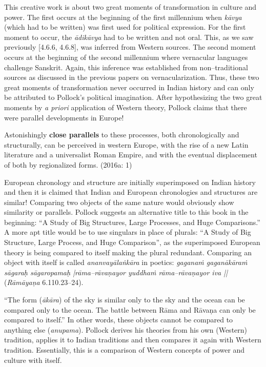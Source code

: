 This creative work is about two great moments of transformation in culture and power. The first occurs at the beginning of the first millennium when \textit{kāvya }(which had to be written) was first used for political expression. For the first moment to occur, the\textit{ ādikāvya }had to be written and not oral. This, as we saw previously [4.6.6, 4.6.8], was inferred from Western sources. The second moment occurs at the beginning of the second millennium where vernacular languages challenge Sanskrit. Again, this inference was established from non–traditional sources as discussed in the previous papers on vernacularization. Thus, these two great moments of transformation never occurred in Indian history and can only be attributed to Pollock’s political imagination. After hypothesizing the two great moments by \textit{a priori} application of Western theory, Pollock claims that there were parallel developments in Europe!

\begin{myquote}
Astonishingly \textbf{close parallels} to these processes, both chronologically and structurally, can be perceived in western Europe, with the rise of a new Latin literature and a universalist Roman Empire, and with the eventual displacement of both by regionalized forms. (2016a: 1)
\end{myquote}

European chronology and structure are initially superimposed on Indian history and then it is claimed that Indian and European chronologies and structures are similar! Comparing two objects of the same nature would obviously show similarity or parallels. Pollock suggests an alternative title to this book in the beginning: “A Study of Big Structures, Large Processes, and Huge Comparisons.” A more apt title would be to use singulars in place of plurals: “A Study of Big Structure, Large Process, and Huge Comparison”, as the superimposed European theory is being compared to itself making the plural redundant. Comparing an object with itself is called \textit{ananvayālaṅkāra} in poetics: \textit{gaganaṁ gaganākāraṁ sāgaraḥ sāgaropamaḥ |rāma–rāvaṇayor yuddhaṁ rāma–rāvaṇayor iva || }(\textit{Rāmāyaṇa} 6.110.23–24).

“The form (\textit{ākāra}) of the sky is similar only to the sky and the ocean can be compared only to the ocean. The battle between Rāma and Rāvaṇa can only be compared to itself.” In other words, these objects cannot be compared to anything else (\textit{anupama}). Pollock derives his theories from his own (Western) tradition, applies it to Indian traditions and then compares it again with Western tradition. Essentially, this is a comparison of Western concepts of power and culture with itself.

